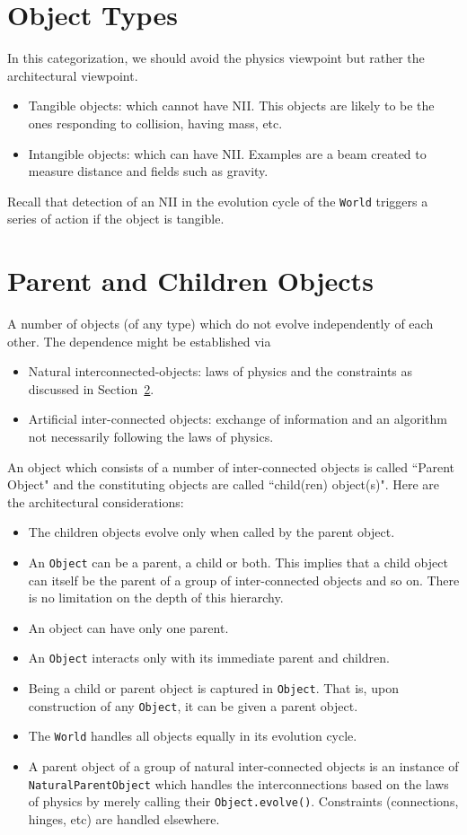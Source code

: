 \documentclass[a4paper]{report}
\begin{document}
\section{Object Types}
In this categorization, we should avoid the physics viewpoint but rather the architectural viewpoint. 
\begin{itemize}
	\item Tangible objects: which cannot have NII. This objects are likely to be the ones responding to collision, having mass, etc.
	\item Intangible objects: which can have NII. Examples are a beam created to measure distance and fields such as gravity.
\end{itemize}

Recall that detection of an NII in the evolution cycle of the \verb+World+ triggers a series of action if the object is tangible.

\section{Parent and Children Objects}
A number of objects (of any type) which do not evolve independently of each other. The dependence might be established via 
\begin{itemize}
	\item Natural interconnected-objects: laws of physics and the constraints as discussed in Section~\ref{}. 
	\item Artificial inter-connected objects: exchange of information and an algorithm not necessarily following the laws of physics. 
\end{itemize}

An object which consists of a number of inter-connected objects is called ``Parent Object" and the constituting objects are called ``child(ren) object(s)". Here are the architectural considerations:
\begin{itemize}
	\item The children objects evolve only when called by the parent object. 
	\item An \verb+Object+ can be a parent, a child or both. This implies that a child object can itself be the parent of a group of inter-connected objects and so on. There is no limitation on the depth of this hierarchy.
	\item An object can have only one parent.
	\item An \verb+Object+ interacts only with its immediate parent and children.
	\item Being a child or parent object is captured in \verb+Object+. That is, upon construction of any \verb+Object+, it can be given a parent object. 
	\item The \verb+World+ handles all objects equally in its evolution cycle.
	\item A parent object of a group of natural inter-connected objects is an instance of \verb+NaturalParentObject+ which handles the interconnections based on the laws of physics by merely calling their \verb+Object.evolve()+. Constraints (connections, hinges, etc) are handled elsewhere. 
\end{itemize}
\end{document}
